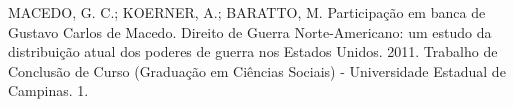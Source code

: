 

\begin{cvhonors}
  \cvhonor
    {MACEDO, G. C.; KOERNER, A.; BARATTO, M.}
    {Participação em banca de Gustavo Carlos de Macedo. Direito de Guerra Norte-Americano: um estudo da distribuição atual dos poderes de guerra nos Estados Unidos. 2011. Trabalho de Conclusão de Curso (Graduação em Ciências Sociais) - Universidade Estadual de Campinas.}
    {}
    {1. }
\end{cvhonors}
